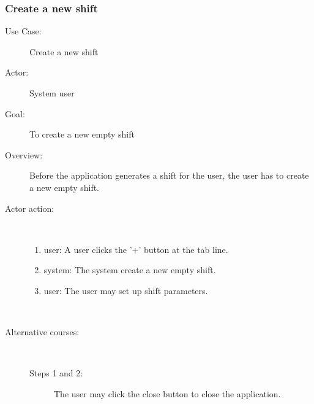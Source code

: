 \documentclass[11pt, oneside]{article}   	%
\begin{document}
\subsubsection{Create a new shift}
\begin{description}
\item[Use Case: ] Create a new shift
\item[Actor: ] System user
\item[Goal: ] To create a new empty shift
\item[Overview: ] Before the application generates a shift for the user, the user has to create a new empty shift.
\item[Actor action: ]
\
\begin{enumerate}
\item user: A user clicks the '+' button at the tab line.
\item system: The system create a new empty shift.
\item user: The user may set up shift parameters.
\end{enumerate}
\
\item[Alternative courses:]
\
\begin{description}
\item[Steps 1 and 2:] The user may click the close button to close the application.
\end{description}
\end{description}
\end{document}
